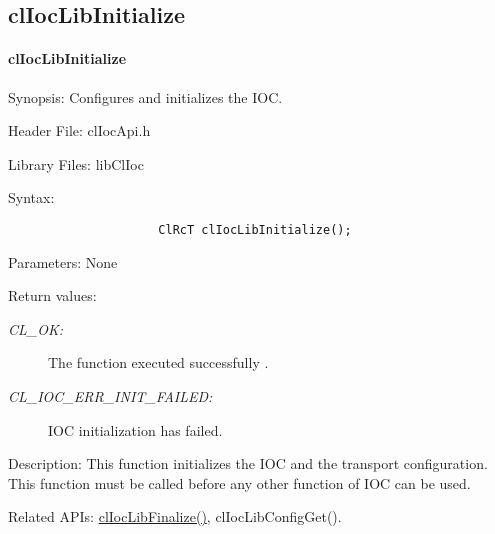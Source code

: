 \begin{flushleft}
\newpage



\subsection{clIocLibInitialize}
\hypertarget{pageIOC131}{}\paragraph{cl\-Ioc\-Lib\-Initialize}\label{pageIOC131}
\begin{Desc}
\item[Synopsis: ]Configures and initializes the IOC.\end{Desc}
\begin{Desc}
\item[Header File:]clIocApi.h\end{Desc}
\begin{Desc}
\item[Library Files:]libClIoc\end{Desc}
\begin{Desc}
\item[Syntax: ]

\footnotesize\begin{verbatim}                     ClRcT clIocLibInitialize(); 
\end{verbatim}
\normalsize
\end{Desc}
\begin{Desc}
\item[Parameters: ]None\end{Desc}
\begin{Desc}
\item[Return values:]
\begin{description}
\item[{\em CL\_\-OK:}]The function executed successfully . \item[{\em CL\_\-IOC\_\-ERR\_\-INIT\_\-FAILED:}]IOC initialization has failed.\end{description}
\end{Desc}
\begin{Desc}
\item[Description: ]This function initializes the IOC and the transport configuration. This function must be called before any other function of IOC
can be used.
\end{Desc}
\begin{Desc}
\item[Related APIs:]\hyperlink{pageIOC132}{clIocLibFinalize()}, clIocLibConfigGet(). \end{Desc}


\end{flushleft}
